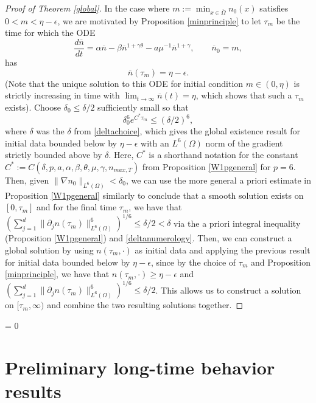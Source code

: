 \documentclass[12pt]{article}
\theoremstyle{plain}
\begin{document}
\begin{proof}[Proof of Theorem \ref{global}]
In the case where $m := \min_{x \in \overline{\Omega}} n_{0}(x)$ satisfies $0 < m < \eta - \epsilon$, we are motivated by Proposition \ref{minprinciple} to let $\tau_{m}$ be the time for which the ODE
\begin{equation*}
\frac{d\overline{n}}{dt} = \alpha \overline{n} - \beta \overline{n}^{1 + \gamma \theta} - a\mu^{-1} \overline{n}^{1 + \gamma}, \qquad \overline{n}_{0} = m,
\end{equation*}
has 
\begin{equation}\label{taum}
\overline{n}(\tau_{m}) = \eta - \epsilon.
\end{equation}
(Note that the unique solution to this ODE for initial condition $m \in (0, \eta)$ is strictly increasing in time with $\lim_{t \to \infty} \overline{n}(t) = \eta$, which shows that such a $\tau_{m}$ exists). Choose $\delta_{0} \le \delta/2$ sufficiently small so that
\begin{equation}\label{deltanumerology}
\delta_{0}^{6}e^{C^{*}\tau_{m}} \le (\delta/2)^{6},
\end{equation}
where $\delta$ was the $\delta$ from \eqref{deltachoice}, which gives the global existence result for initial data bounded below by $\eta - \epsilon$ with an $L^{6}(\Omega)$ norm of the gradient strictly bounded above by $\delta$. Here, $C^{*}$ is a shorthand notation for the constant $C^{*} := C(\delta, p, a, \alpha, \beta, \theta, \mu, \gamma, n_{max, T})$ from Proposition \ref{W1pgeneral} for $p = 6$. Then, given $\|\nabla n_{0}\|_{L^{6}(\Omega)} < \delta_{0}$, we can use the more general a priori estimate in Proposition \ref{W1pgeneral} similarly to conclude that a smooth solution exists on $[0, \tau_{m}]$ and for the final time $\tau_{m}$, we have that $\left(\sum_{j = 1}^{d} \|\partial_{j}n(\tau_{m})\|_{L^{6}(\Omega)}^{6}\right)^{1/6} \le \delta/2 < \delta$ via the a priori integral inequality (Proposition \ref{W1pgeneral}) and \eqref{deltanumerology}. Then, we can construct a global solution by using $n(\tau_{m}, \cdot)$ as initial data and applying the previous result for initial data bounded below by $\eta - \epsilon$, since by the choice of $\tau_{m}$ and Proposition \ref{minprinciple}, we have that $n(\tau_{m}, \cdot) \ge \eta - \epsilon$ and $\left(\sum_{j = 1}^{d} \|\partial_{j} n(\tau_{m})\|_{L^{6}(\Omega)}^{6}\right)^{1/6} \le \delta/2$. This allows us to construct a solution on $[\tau_{m}, \infty)$ and combine the two resulting solutions together. 
\end{proof}

 = 0
\section{Preliminary long-time behavior results}
\end{document}
